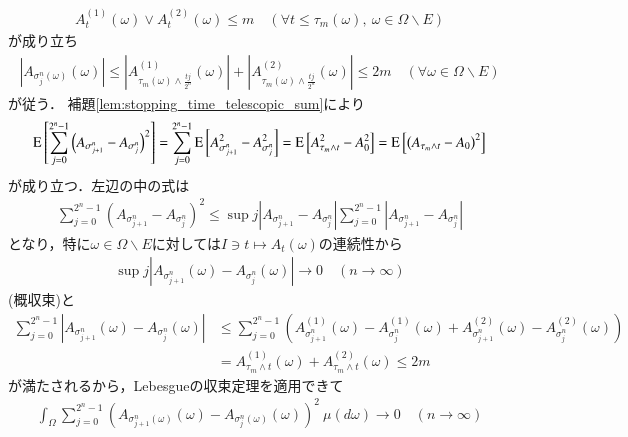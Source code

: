 \begin{prf}
{			\begin{align}
				A_t^{(1)}(\omega) \vee A_t^{(2)}(\omega) \leq m \quad (\forall t \leq \tau_m(\omega),\ \omega \in \Omega \backslash E)
			\end{align}
			が成り立ち
			\begin{align}
				\left| A_{\sigma_j^n(\omega)}(\omega) \right| 
				\leq \left| A^{(1)}_{\tau_m(\omega)\wedge \frac{tj}{2^n}}(\omega) \right| + \left| A^{(2)}_{\tau_m(\omega)\wedge \frac{tj}{2^n}}(\omega) \right|
				\leq 2m
				\quad (\forall \omega \in \Omega \backslash E)
			\end{align}
			が従う．
		}
		補題\ref{lem:stopping_time_telescopic_sum}により
		\begin{align}
			\operatorname{E} \left[ \sum_{j=0}^{2^n-1} \left( A_{\sigma_{j+1}^n} - A_{\sigma_j^n} \right)^2 \right]
			= \sum_{j=0}^{2^n-1} \operatorname{E} \left[ A_{\sigma_{j+1}^n}^2 - A_{\sigma_j^n}^2 \right]
			= \operatorname{E} \left[ A_{\tau_m \wedge t}^2 - A_{0}^2 \right]
			= \operatorname{E} \left[ \left( A_{\tau_m \wedge t} - A_{0} \right)^2 \right]
		\end{align}
		が成り立つ．左辺の中の式は
		\begin{align}
			\sum_{j=0}^{2^n-1} \left( A_{\sigma_{j+1}^n} - A_{\sigma_j^n} \right)^2
			\leq \sup{j}{\left| A_{\sigma_{j+1}^n} - A_{\sigma_j^n} \right|} \sum_{j=0}^{2^n-1} \left| A_{\sigma_{j+1}^n} - A_{\sigma_j^n} \right|
		\end{align}
		となり，特に$\omega \in \Omega \backslash E$に対しては$I \ni t \longmapsto A_t(\omega)$の連続性から
		\begin{align}
			\sup{j}{\left| A_{\sigma_{j+1}^n}(\omega) - A_{\sigma_j^n}(\omega) \right|} \longrightarrow 0 \quad (n \longrightarrow \infty)
		\end{align}
		(概収束)と
		\begin{align}
			\sum_{j=0}^{2^n-1} \left| A_{\sigma_{j+1}^n}(\omega) - A_{\sigma_j^n}(\omega) \right|
			&\leq \sum_{j=0}^{2^n-1} \left( A^{(1)}_{\sigma_{j+1}^n}(\omega) - A^{(1)}_{\sigma_j^n}(\omega) + A^{(2)}_{\sigma_{j+1}^n}(\omega) - A^{(2)}_{\sigma_j^n}(\omega) \right) \\
			&= A^{(1)}_{\tau_m \wedge t}(\omega) + A^{(2)}_{\tau_m \wedge t}(\omega) \leq 2m
		\end{align}
		が満たされるから，Lebesgueの収束定理を適用できて
		\begin{align}
			\int_\Omega \sum_{j=0}^{2^n-1} \left( A_{\sigma_{j+1}^n(\omega)}(\omega) - A_{\sigma_j^n(\omega)}(\omega) \right)^2\ \mu(d\omega) \longrightarrow 0 \quad (n \longrightarrow \infty)
		\end{align}

\end{prf}
